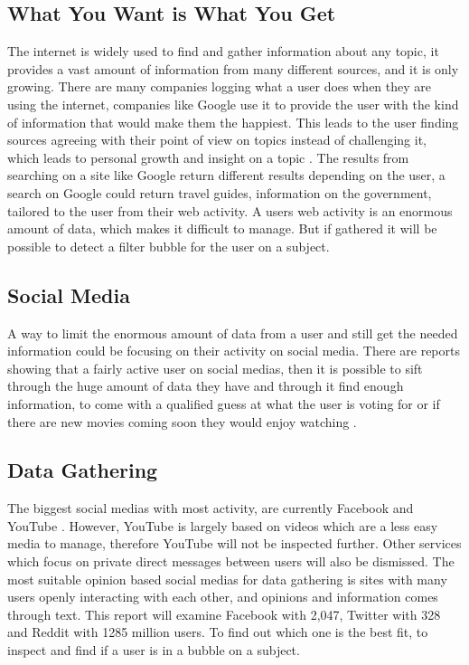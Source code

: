 \subsection{What You Want is What You Get}
The internet is widely used to find and gather information about any topic, it
provides a vast amount of information from many different sources, and it is
only growing. There are many companies logging what a user does when they are
using the internet, companies like Google use it to provide the user with the
kind of information that would make them the happiest. This leads to the user
finding sources agreeing with their point of view on topics instead of
challenging it, which leads to personal growth and insight on a topic
\citep{tedFilterBubble}. The results from searching on a site like Google return
different results depending on the user, a search on Google could return travel
guides, information on the government, tailored to the user from their web
activity. A users web activity is an enormous amount of data, which makes it
difficult to manage. But if gathered it will be possible to detect a filter
bubble for the user on a subject.

\subsection{Social Media}
A way to limit the enormous amount of data from a user and still get the needed
information could be focusing on their activity on social media.
There are reports showing that a fairly active user on social medias, then it is
possible to sift through the huge amount of data they have and through it find
enough information, to come with a qualified guess at what the user is voting
for or if there are new movies coming soon they would enjoy watching
\citep{Personality}.

\subsection{Data Gathering}
The biggest social medias with most activity, are currently Facebook and YouTube
\citep{SocialMediaStats}.
However, YouTube is largely based on videos which are a less easy media to
manage, therefore YouTube will not be inspected further. Other services which
focus on private direct messages between users will also be dismissed. The most
suitable opinion based social medias for data gathering is sites with many users
openly interacting with each other, and opinions and information comes through
text. This report will examine Facebook with 2,047, Twitter with 328 and Reddit
with 1285 million users. To find out which one is the best fit, to inspect and
find if a user is in a bubble on a subject.

